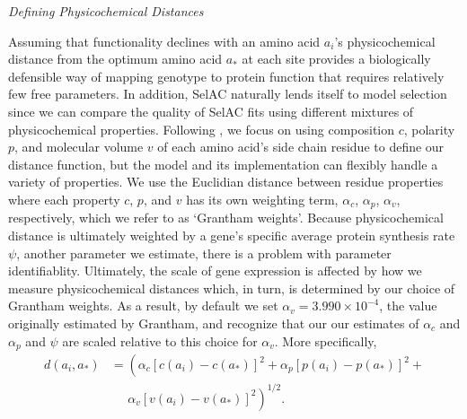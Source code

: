 \documentclass[12pt,letterpaper]{article}
\renewcommand{\subsection}[1]{%
\bigskip
\begin{center}
\begin{large}
\normalfont\itshape #1
\end{large}
\end{center}}
\newcommand{\selac}{SelAC\xspace}
\newcommand{\alphac}{\ensuremath{\alpha_c}\xspace}
\newcommand{\alphap}{\ensuremath{\alpha_p}\xspace}
\newcommand{\alphav}{\ensuremath{\alpha_v}\xspace}
\newcommand{\aopt}{\ensuremath{a_*}\xspace}
\begin{document}
\subsection{Defining Physicochemical Distances}
Assuming that functionality declines with an amino acid $a_i$'s physicochemical distance from the optimum amino acid \aopt at each site provides a biologically defensible way of mapping genotype to protein function that requires relatively few free parameters.
In addition, \selac naturally lends itself to model selection since we can compare the quality of \selac fits using different mixtures of physicochemical properties.
Following \cite{Grantham1974}, we focus on using composition $c$, polarity $p$, and molecular volume $v$ of each amino acid's side chain residue to define our distance function, but the model and its implementation can flexibly handle a variety of properties.
We use the Euclidian distance between residue properties where each property $c$, $p$, and $v$ has its own weighting term, $\alphac$, $\alphap$, $\alphav$, respectively, which we refer to as `Grantham weights'.
Because physicochemical distance is ultimately weighted by a gene's specific average protein synthesis rate $\psi$, another parameter we estimate, there is a problem with parameter identifiablity.
Ultimately, the scale of gene expression is affected by how we measure physicochemical distances which, in turn, is determined by our choice of Grantham weights.
As a result, by default we set $\alphav = 3.990 \times 10^{-4}$, the value originally estimated by Grantham, and recognize that our our estimates of $\alphac$ and $\alphap$ and $\psi$ are scaled relative to this choice for $\alphav$.
More specifically,
\begin{align*}
  d(a_i, \aopt) &= \left(\alphac \left[c\left(a_i\right) - c\left(\aopt\right)\right]^2 + \alphap \left[p\left(a_i\right) - p\left(\aopt\right)\right]^2 + \right.\\
  & \;\;\;\;\;\left. \alphav \left[v\left(a_i\right) - v\left(\aopt\right)\right]^2\right)^{1/2}.
\end{align*}
\end{document}
